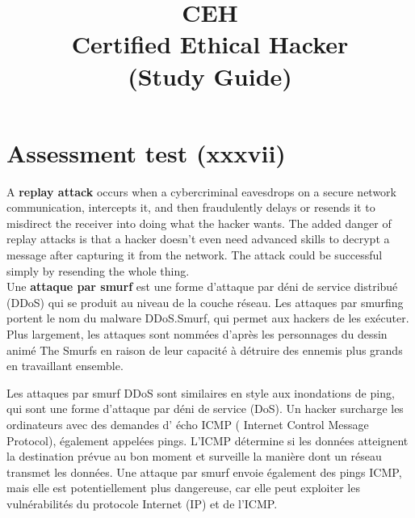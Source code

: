\documentclass[a4paper]{article}
\title{%
  CEH \\
  \large Certified Ethical Hacker \\
    (Study Guide)}
\author{}
\begin{document}
\maketitle

\section*{Assessment test (xxxvii)}
A \textbf{replay attack} occurs when a cybercriminal eavesdrops on a secure network communication, intercepts it, and then fraudulently delays or resends it to misdirect the receiver into doing what the hacker wants. The added danger of replay attacks is that a hacker doesn't even need advanced skills to decrypt a message after capturing it from the network. The attack could be successful simply by resending the whole thing. \\


Une \textbf{attaque par smurf} est une forme d’attaque par déni de service distribué (DDoS) qui se produit au niveau de la couche réseau. Les attaques par smurfing portent le nom du malware DDoS.Smurf, qui permet aux hackers de les exécuter. Plus largement, les attaques sont nommées d’après les personnages du dessin animé The Smurfs en raison de leur capacité à détruire des ennemis plus grands en travaillant ensemble.

Les attaques par smurf DDoS sont similaires en style aux inondations de ping, qui sont une forme d’attaque par déni de service (DoS). Un hacker surcharge les ordinateurs avec des demandes d’ écho ICMP ( Internet Control Message Protocol), également appelées pings. L’ICMP détermine si les données atteignent la destination prévue au bon moment et surveille la manière dont un réseau transmet les données. Une attaque par smurf envoie également des pings ICMP, mais elle est potentiellement plus dangereuse, car elle peut exploiter les vulnérabilités du protocole Internet (IP) et de l’ICMP.
\end{document}
